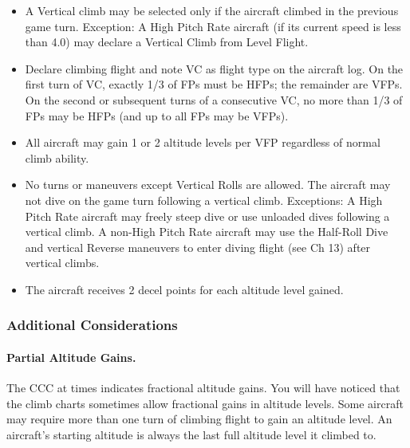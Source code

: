 \begin{itemize}

    \item{} A Vertical climb may be selected only if the aircraft climbed in the previous game turn. Exception: A High Pitch Rate aircraft (if its current speed is less than 4.0) may declare a Vertical Climb from Level Flight.

    \item{} Declare climbing flight and note VC as flight type on the aircraft log. On the first turn of VC, exactly 1/3 of FPs must be HFPs; the remainder are VFPs. On the second or subsequent turns of a consecutive VC, no more than 1/3 of FPs may be HFPs (and up to all FPs may be VFPs).

    \item{} All aircraft may gain 1 or 2 altitude levels per VFP regardless of normal climb ability.

    \item{} No turns or maneuvers except Vertical Rolls are allowed. The aircraft may not dive on the game turn following a vertical climb. Exceptions: A High Pitch Rate aircraft may freely steep dive or use unloaded dives following a vertical climb. A non-High Pitch Rate aircraft may use the Half-Roll Dive and vertical Reverse maneuvers to enter diving flight (see Ch 13) after vertical climbs.

    \item{} The aircraft receives 2 decel points for each altitude level gained.

\end{itemize}

\subsubsection{Additional Considerations}

\paragraph{Partial Altitude Gains.} The CCC at times indicates fractional altitude gains. You will have noticed that the climb charts sometimes allow fractional gains in altitude levels. Some aircraft may require more than one turn of climbing flight to gain an altitude level. An aircraft's starting altitude is always the last full altitude level it climbed to. 

